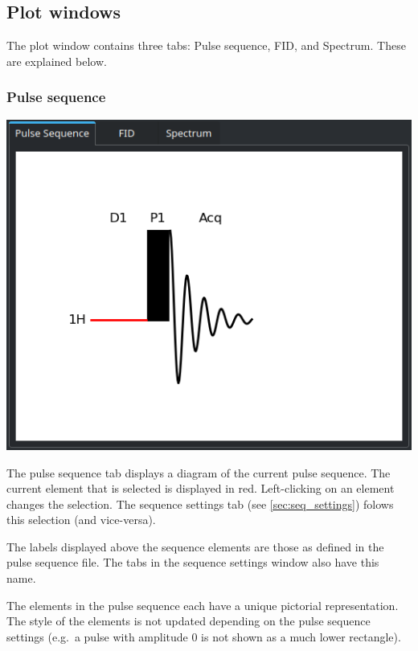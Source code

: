\documentclass[11pt,a4paper]{article}
\begin{document}
\subsection{Plot windows}
The plot window contains three tabs: Pulse sequence, FID, and Spectrum. These are explained below.
\subsubsection{Pulse sequence}\label{sec:inter:pulse}
\begin{center}
\includegraphics[width=0.9\linewidth]{images/Plot_sequence.png}
\end{center}
The pulse sequence tab displays a diagram of the current pulse sequence. The current element that is selected is displayed in red. Left-clicking on an element changes the selection. The sequence settings tab (see \autoref{sec:seq_settings}) folows this selection (and vice-versa).

The labels displayed above the sequence elements are those as defined in the pulse sequence file. The tabs in the sequence settings window also have this name.

The elements in the pulse sequence each have a unique pictorial representation. The style of the elements is not updated depending on the pulse sequence settings (e.g.\ a pulse with amplitude 0 is not shown as a much lower rectangle).
\end{document}
